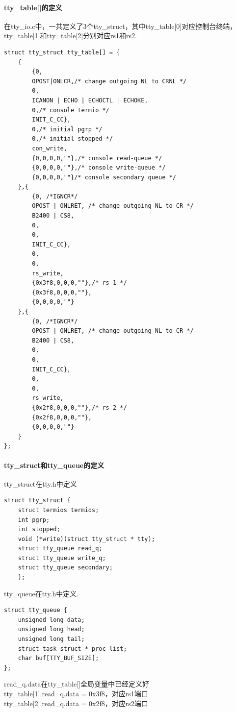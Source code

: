 \documentclass[12pt]{article}
\begin{document}
\paragraph{tty\_table[]的定义}
在tty\_io.c中，一共定义了3个tty\_struct，其中tty\_table[0]对应控制台终端，tty\_table[1]和tty\_table[2]分别对应rs1和rs2.
\begin{lstlisting}[breaklines]
struct tty_struct tty_table[] = {
	{
		{0,
		OPOST|ONLCR,/* change outgoing NL to CRNL */
		0,
		ICANON | ECHO | ECHOCTL | ECHOKE,
		0,/* console termio */
		INIT_C_CC},
		0,/* initial pgrp */
		0,/* initial stopped */
		con_write,
		{0,0,0,0,""},/* console read-queue */
		{0,0,0,0,""},/* console write-queue */
		{0,0,0,0,""}/* console secondary queue */
	},{
		{0, /*IGNCR*/
		OPOST | ONLRET,	/* change outgoing NL to CR */
		B2400 | CS8,
		0,
		0,
		INIT_C_CC},
		0,
		0,
		rs_write,
		{0x3f8,0,0,0,""},/* rs 1 */
		{0x3f8,0,0,0,""},
		{0,0,0,0,""}
	},{
		{0, /*IGNCR*/
		OPOST | ONLRET,	/* change outgoing NL to CR */
		B2400 | CS8,
		0,
		0,
		INIT_C_CC},
		0,
		0,
		rs_write,
		{0x2f8,0,0,0,""},/* rs 2 */
		{0x2f8,0,0,0,""},
		{0,0,0,0,""}
	}
};
\end{lstlisting}
\paragraph{tty\_struct和tty\_queue的定义}
tty\_struct在tty.h中定义\\
\begin{lstlisting}[breaklines]
struct tty_struct {
	struct termios termios;
	int pgrp;
	int stopped;
	void (*write)(struct tty_struct * tty);
	struct tty_queue read_q;
	struct tty_queue write_q;
	struct tty_queue secondary;
	};
\end{lstlisting}
tty\_queue在tty.h中定义.\\
\begin{lstlisting}[breaklines]
struct tty_queue {
	unsigned long data;
	unsigned long head;
	unsigned long tail;
	struct task_struct * proc_list;
	char buf[TTY_BUF_SIZE];
};
\end{lstlisting}
read\_q.data在tty\_table[]全局变量中已经定义好\\
tty\_table[1].read\_q.data = 0x3f8，对应rs1端口\\
tty\_table[2].read\_q.data = 0x2f8，对应rs2端口
\end{document}
